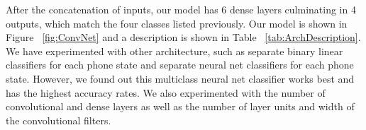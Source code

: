 After the concatenation of inputs, our model has 6 dense layers culminating in 4 outputs, which match the four classes listed previously. 
Our model is shown in Figure ~\ref{fig:ConvNet} and a description is shown in Table ~\ref{tab:ArchDescription}.
We have experimented with other architecture, such as separate binary linear classifiers for each phone state and separate neural net classifiers for each phone state.
However, we found out this multiclass neural net classifier works best and has the highest accuracy rates. 
We also experimented with the number of convolutional and dense layers as well as the number of layer units and width of the convolutional filters.
